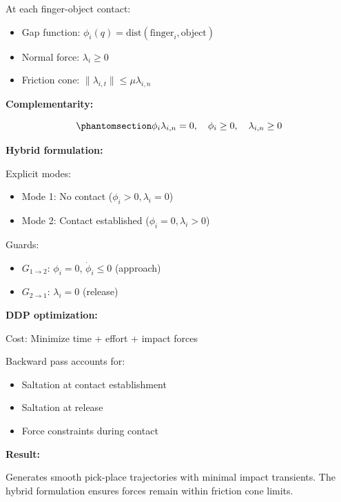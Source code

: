 \documentclass[
  letterpaper,
  DIV=11,
  numbers=noendperiod]{scrartcl}
\providecommand{\tightlist}{%
  \setlength{\itemsep}{0pt}\setlength{\parskip}{0pt}}\usepackage{longtable,booktabs,array}
\begin{document}
At each finger-object contact:

\begin{itemize}
\tightlist
\item
  Gap function:
  \(\phi_i(q) = \text{dist}(\text{finger}_i, \text{object})\)
\item
  Normal force: \(\lambda_i \geq 0\)
\item
  Friction cone: \(\|\lambda_{i,t}\| \leq \mu \lambda_{i,n}\)
\end{itemize}

\textbf{Complementarity:}

\begin{equation}\phantomsection\label{eq-grasp-complementarity}{
\phi_i \lambda_{i,n} = 0, \quad \phi_i \geq 0, \quad \lambda_{i,n} \geq 0
}\end{equation}

\textbf{Hybrid formulation:}

Explicit modes:

\begin{itemize}
\tightlist
\item
  Mode 1: No contact (\(\phi_i > 0, \lambda_i = 0\))
\item
  Mode 2: Contact established (\(\phi_i = 0, \lambda_i > 0\))
\end{itemize}

Guards:

\begin{itemize}
\tightlist
\item
  \(G_{1 \to 2}\): \(\phi_i = 0\), \(\dot{\phi}_i \leq 0\) (approach)
\item
  \(G_{2 \to 1}\): \(\lambda_i = 0\) (release)
\end{itemize}

\textbf{DDP optimization:}

Cost: Minimize time + effort + impact forces

Backward pass accounts for:

\begin{itemize}
\tightlist
\item
  Saltation at contact establishment
\item
  Saltation at release
\item
  Force constraints during contact
\end{itemize}

\textbf{Result:}

Generates smooth pick-place trajectories with minimal impact transients.
The hybrid formulation ensures forces remain within friction cone
limits.
\end{document}
